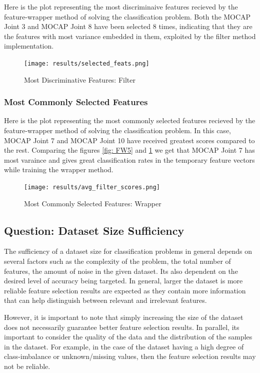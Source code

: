 \documentclass[12pt,twoside,a4paper]{article}
\begin{document}
Here is the plot representing the most discriminaive features recieved by the feature-wrapper method of solving the classification problem. Both the MOCAP Joint 3 and MOCAP Joint 8 have been selected 8 times, indicating that they are the features with most variance embedded in them, exploited by the filter method implementation.

\begin{figure}[H]
    \centering
    \texttt{[image: results/selected\_feats.png]}
    \caption{Most Discriminative Features: Filter}
    \label{fig: FW6}
\end{figure}

\subsubsection*{Most Commonly Selected Features}

Here is the plot representing the most commonly selected features recieved by the feature-wrapper method of solving the classification problem. In this case, MOCAP Joint 7 and MOCAP Joint 10 have received greatest scores compared to the rest. Comparing the figures \ref{fig: FW5} and \ref{fig: FW6} we get that MOCAP Joint 7 has most varaince and gives great classification rates in the temporary feature vectors while training the wrapper method.

\begin{figure}[H]
    \centering
    \texttt{[image: results/avg\_filter\_scores.png]}
    \caption{Most Commonly Selected Features: Wrapper}
    \label{fig: FW7}
\end{figure}

\subsection{Question: Dataset Size Sufficiency}
The sufficiency of a dataset size for classification problems in general depends on several factors such as the complexity of the problem, the total number of features, the amount of noise in the given dataset. Its also dependent on the desired level of accuracy being targeted. In general, larger the dataset is more reliable feature selection results are expected as they contain more information that can help distinguish between relevant and irrelevant features.

However, it is important to note that simply increasing the size of the dataset does not necessarily guarantee better feature selection results. In parallel, its important to consider the quality of the data and the distribution of the samples in the dataset. For example, in the case of the dataset having a high degree of class-imbalance or unknown/missing values, then the feature selection results may not be reliable.
\end{document}
